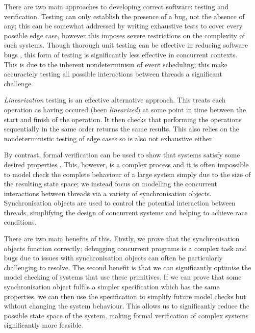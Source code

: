 There are two main approaches to developing correct software: testing and verification. 
Testing can only establish the presence of a bug, not the absence of any; this can be somewhat addressed by writing exhaustive tests to cover every possible edge case, however this imposes severe restrictions on the complexity of such systems. Though thorough unit testing can be effective in reducing software bugs \cite{MicroTest}, this form of testing is significantly less effective in concurrent contexts. This is due to the inherent nondeterminism of event scheduling; this make accuractely testing all possible interactions between threads a significant challenge.

\emph{Linearization} testing is an effective alternative approach.
This treats each operation as having occured (been \emph{linearized}) at some point in time between the start and finish of the operation. It then checks that performing the operations sequentially in the same order returns the same results.
This also relies on the nondeterministic testing of edge cases so is also not exhaustive either \cite{LoweLin}. %

By contrast, formal verification can be used to show that systems satisfy some desired properties \cite{PrinciplesOfModelChecking}. This, however, is a complex process and it is often impossible to model check the complete behaviour of a large system simply due to the size of the resulting state space; we instead focus on modelling the concurrent interactions between threads via a variety of synchronisation objects. Synchronisation objects are used to control the potential interaction between threads, simplifying the design of concurrent systems and helping to achieve race conditions.

There are two main benefits of this. Firstly, we prove that the synchronisation objects function correctly; debugging concurrent programs is a complex task and bugs due to issues with synchronisation objects can often be particularly challenging to resolve. The second benefit is that we can significantly optimise the model checking of systems that use these primitives. 
If we can prove that some synchronisation object fulfils a simpler specification which has the same properties, we can then use the specification to simplify future model checks but wihtout changing the system behaviour.%
This allows us to significantly reduce the possible state space of the system, making formal verification of complex systems significantly more feasible.

